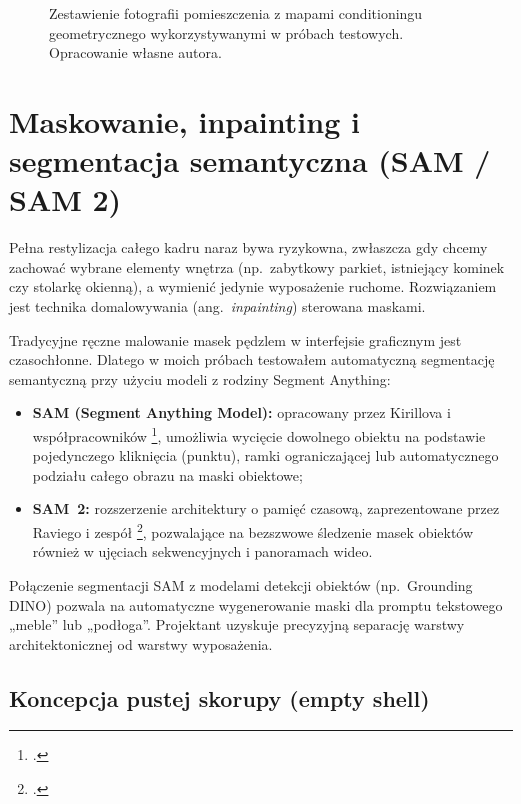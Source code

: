 \begin{figure}[htbp]
  \centering
  \caption{Zestawienie fotografii pomieszczenia z mapami conditioningu geometrycznego wykorzystywanymi w próbach testowych.
  Opracowanie własne autora.}
  \label{fig:ch04:depth}
\end{figure}

\section{Maskowanie, inpainting i segmentacja semantyczna (SAM / SAM 2)}
\label{ch04:sec:sam}

Pełna restylizacja całego kadru naraz bywa ryzykowna, zwłaszcza gdy chcemy zachować wybrane elementy wnętrza (np.\ zabytkowy parkiet, istniejący kominek czy stolarkę okienną), a wymienić jedynie wyposażenie ruchome. Rozwiązaniem jest technika domalowywania (ang.\ \emph{inpainting}) sterowana maskami.

Tradycyjne ręczne malowanie masek pędzlem w interfejsie graficznym jest czasochłonne. Dlatego w moich próbach testowałem automatyczną segmentację semantyczną przy użyciu modeli z rodziny Segment Anything:
\begin{itemize}
  \item \textbf{SAM (Segment Anything Model):} opracowany przez Kirillova i współpracowników \footcite{kirillov2023sam}, umożliwia wycięcie dowolnego obiektu na podstawie pojedynczego kliknięcia (punktu), ramki ograniczającej lub automatycznego podziału całego obrazu na maski obiektowe;
  \item \textbf{SAM~2:} rozszerzenie architektury o pamięć czasową, zaprezentowane przez Raviego i zespół \footcite{ravi2024sam2}, pozwalające na bezszwowe śledzenie masek obiektów również w ujęciach sekwencyjnych i panoramach wideo.
\end{itemize}

Połączenie segmentacji SAM z modelami detekcji obiektów (np.\ Grounding DINO) pozwala na automatyczne wygenerowanie maski dla promptu tekstowego „meble” lub „podłoga”. Projektant uzyskuje precyzyjną separację warstwy architektonicznej od warstwy wyposażenia.

\subsection{Koncepcja pustej skorupy (empty shell)}
\label{ch04:sec:empty-shell}

